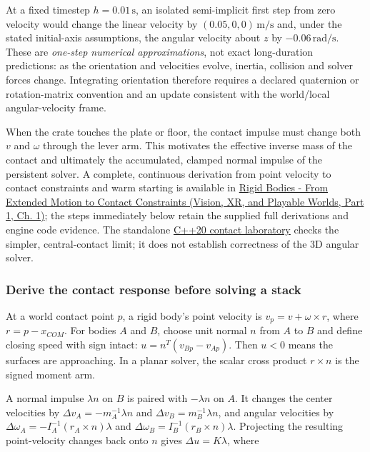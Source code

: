At a fixed timestep \(h=0.01\,\mathrm s\), an isolated semi-implicit first step from zero velocity would change the linear velocity by \((0.05,0,0)\,\mathrm{m/s}\) and, under the stated initial-axis assumptions, the angular velocity about \(z\) by \(-0.06\,\mathrm{rad/s}\). These are \emph{one-step numerical approximations}, not exact long-duration predictions: as the orientation and velocities evolve, inertia, collision and solver forces change. Integrating orientation therefore requires a declared quaternion or rotation-matrix convention and an update consistent with the world/local angular-velocity frame.

When the crate touches the plate or floor, the contact impulse must change both \(v\) and \(\omega\) through the lever arm. This motivates the effective inverse mass of the contact and ultimately the accumulated, clamped normal impulse of the persistent solver. A complete, continuous derivation from point velocity to contact constraints and warm starting is available in \href{../07-Vision-XR-and-Playable-Worlds-P01/main.pdf\#02-foundations-ii-ch039-physical-foundations-rigid-bodies-extended-motion-and-contact-constraints}{Rigid Bodies - From Extended Motion to Contact Constraints (Vision, XR, and Playable Worlds, Part 1, Ch. 1)}; the steps immediately below retain the supplied full derivations and engine code evidence. The standalone \hyperref[source-file-128143bcbfc7213e97eaefa4]{C++20 contact laboratory} checks the simpler, central-contact limit; it does not establish correctness of the 3D angular solver.

\subsubsection{Derive the contact response before solving a stack}\label{06-engine-ii-ch034-derive-the-contact-response-before-solving-a-stack}

\hypertarget{06-engine-ii-ch034-derive-the-contact-response-before-solving-a-stack}{}

At a world contact point \(p\), a rigid body's point velocity is \(v_p=v+\omega\times r\), where \(r=p-x_{COM}\). For bodies \(A\) and \(B\), choose unit normal \(n\) from \(A\) to \(B\) and define closing speed with sign intact: \(u=n^T(v_{Bp}-v_{Ap})\). Then \(u<0\) means the surfaces are approaching. In a planar solver, the scalar cross product \(r\times n\) is the signed moment arm.

A normal impulse \(\lambda n\) on \(B\) is paired with \(-\lambda n\) on \(A\). It changes the center velocities by \(\Delta v_A=-m_A^{-1}\lambda n\) and \(\Delta v_B=m_B^{-1}\lambda n\), and angular velocities by \(\Delta\omega_A=-I_A^{-1}(r_A\times n)\lambda\) and \(\Delta\omega_B=I_B^{-1}(r_B\times n)\lambda\). Projecting the resulting point-velocity changes back onto \(n\) gives \(\Delta u=K\lambda\), where

